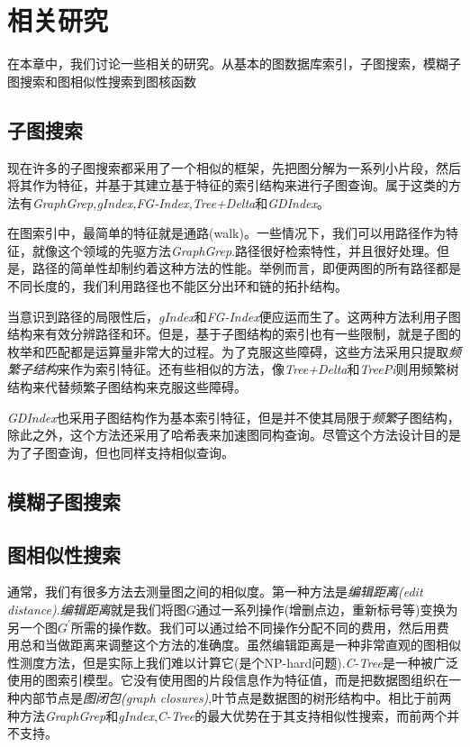 \documentclass{article}
\begin{document}
\else

\fi
\section{相关研究}
在本章中，我们讨论一些相关的研究。从基本的图数据库索引，子图搜索，模糊子图搜索和图相似性搜索到图核函数
\subsection{子图搜索}
现在许多的子图搜索都采用了一个相似的框架，先把图分解为一系列小片段，然后将其作为特征，并基于其建立基于特征的索引结构来进行子图查询。属于这类的方法有\emph{GraphGrep,gIndex,FG-Index,Tree+Delta}和\emph{GDIndex}。

在图索引中，最简单的特征就是通路(walk)。一些情况下，我们可以用路径作为特征，就像这个领域的先驱方法\emph{GraphGrep}.路径很好检索特性，并且很好处理。但是，路径的简单性却制约着这种方法的性能。举例而言，即便两图的所有路径都是不同长度的，我们利用路径也不能区分出环和链的拓扑结构。

当意识到路径的局限性后，\emph{gIndex}和\emph{FG-Index}便应运而生了。这两种方法利用子图结构来有效分辨路径和环。但是，基于子图结构的索引也有一些限制，就是子图的枚举和匹配都是运算量非常大的过程。为了克服这些障碍，这些方法采用只提取\emph{频繁子结构}来作为索引特征。还有些相似的方法，像\emph{Tree+Delta}和\emph{TreePi}则用频繁树结构来代替频繁子图结构来克服这些障碍。

\emph{GDIndex}也采用子图结构作为基本索引特征，但是并不使其局限于\emph{频繁}子图结构，除此之外，这个方法还采用了哈希表来加速图同构查询。尽管这个方法设计目的是为了子图查询，但也同样支持相似查询。

\subsection{模糊子图搜索}




\subsection{图相似性搜索}
通常，我们有很多方法去测量图之间的相似度。第一种方法是\emph{编辑距离(edit distance)}.\emph{编辑距离}就是我们将图$G$通过一系列操作(增删点边，重新标号等)变换为另一个图$G^{'}$所需的操作数。我们可以通过给不同操作分配不同的费用，然后用费用总和当做距离来调整这个方法的准确度。虽然编辑距离是一种非常直观的图相似性测度方法，但是实际上我们难以计算它(是个NP-hard问题).\emph{C-Tree}\cite{C-Tree}是一种被广泛使用的图索引模型。它没有使用图的片段信息作为特征值，而是把数据图组织在一种内部节点是\emph{图闭包(graph closures)},叶节点是数据图的树形结构中。相比于前两种方法\emph{GraphGrep}和\emph{gIndex},\emph{C-Tree}的最大优势在于其支持相似性搜索，而前两个并不支持。
\end{document}
